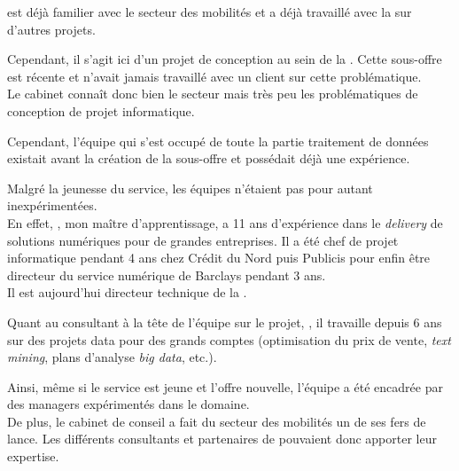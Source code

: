 \tnp est déjà familier avec le secteur des mobilités et a déjà travaillé avec la \sncf sur d'autres projets.

Cependant, il s'agit ici d'un projet de conception au sein de la \df. Cette sous-offre est récente et \tnp n'avait jamais travaillé avec un client sur cette problématique.\\
Le cabinet connaît donc bien le secteur mais très peu les problématiques de conception de projet informatique.

Cependant, l'équipe \ds qui s'est occupé de toute la partie traitement de données existait avant la création de la sous-offre et possédait déjà une expérience.

Malgré la jeunesse du service, les équipes n'étaient pas pour autant inexpérimentées.\\
En effet, \damien, mon maître d'apprentissage, a 11 ans d’expérience dans le \emph{delivery} de solutions numériques pour de grandes entreprises. Il a été chef de projet informatique pendant 4 ans chez Crédit du Nord puis Publicis pour enfin être directeur du service numérique de Barclays pendant 3 ans.\\
Il est aujourd'hui directeur technique de la \df.

Quant au consultant à la tête de l'équipe \emph{\ds} sur le projet, \artem, il travaille depuis 6 ans sur des projets data pour des grands comptes (optimisation du prix de vente, \textit{text mining}, plans d'analyse \textit{big data}, etc.).

Ainsi, même si le service est jeune et l'offre nouvelle, l'équipe a été encadrée par des managers expérimentés dans le domaine.\\
De plus, le cabinet de conseil a fait du secteur des mobilités un de ses fers de lance. Les différents consultants et partenaires de \tnp pouvaient donc apporter leur expertise.
